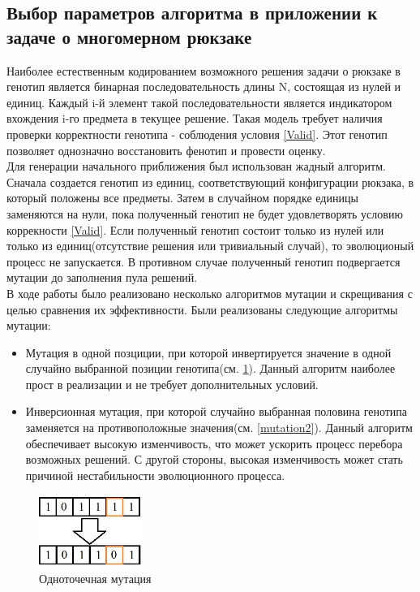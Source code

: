 \subsection{Выбор параметров алгоритма в приложении к задаче о многомерном рюкзаке}
Наиболее естественным кодированием возможного решения задачи о рюкзаке в генотип является бинарная последовательность длины N, состоящая из нулей и единиц.
Каждый i-й элемент такой последовательности является индикатором вхождения i-го предмета в текущее решение. Такая модель требует наличия проверки корректности генотипа - соблюдения условия \ref{Valid}. Этот генотип позволяет однозначно восстановить фенотип и провести оценку.
\\ Для генерации начального приближения был использован жадный алгоритм. Сначала создается генотип из единиц, соответствующий конфигурации рюкзака, в который положены все предметы. Затем в случайном порядке единицы заменяются на нули, пока полученный генотип не будет удовлетворять условию коррекности \ref{Valid}. Если полученный генотип состоит только из нулей или только из единиц(отсутствие решения или тривиальный случай), то эволюционый процесс не запускается. 
В противном случае полученный генотип подвергается мутации до заполнения пула решений.
\\ В ходе работы было реализовано несколько алгоритмов мутации и скрещивания с целью сравнения их эффективности. Были реализованы следующие алгоритмы мутации:
\begin{itemize}
	\item Мутация в одной позциции, при которой инвертируется значение в одной случайно выбранной позиции генотипа(см. \ref{mutation1}). Данный алгоритм наиболее прост в реализации и не требует дополнительных условий.
	\item Инверсионная мутация, при которой случайно выбранная половина генотипа заменяется на противоположные значения(см. \ref{mutation2}). Данный алгоритм обеспечивает высокую изменчивость, что может ускорить процесс перебора возможных решений. С другой стороны, высокая изменчивость может стать причиной нестабильности эволюционного процесса. 
\end{itemize}
\FloatBarrier
	\begin{figure}[htbp]	
	\includegraphics[width=0.3\textwidth]{./Pics/1.jpg}
	\caption{Одноточечная мутация}
	\label{mutation1}
	\end{figure}	

